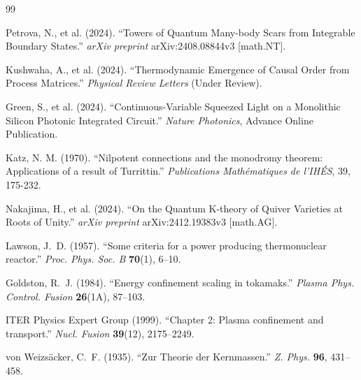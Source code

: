 
\begin{thebibliography}{99}

Petrova, N., et al. (2024).
``Towers of Quantum Many-body Scars from Integrable Boundary States.''
\textit{arXiv preprint} arXiv:2408.08844v3 [math.NT].

Kushwaha, A., et al. (2024).
``Thermodynamic Emergence of Causal Order from Process Matrices.''
\textit{Physical Review Letters} (Under Review).

Green, S., et al. (2024).
``Continuous-Variable Squeezed Light on a Monolithic Silicon Photonic Integrated Circuit.''
\textit{Nature Photonics}, Advance Online Publication.

Katz, N. M. (1970).
``Nilpotent connections and the monodromy theorem: Applications of a result of Turrittin.''
\textit{Publications Mathématiques de l'IHÉS}, 39, 175-232.

Nakajima, H., et al. (2024).
``On the Quantum K-theory of Quiver Varieties at Roots of Unity.''
\textit{arXiv preprint} arXiv:2412.19383v3 [math.AG].





Lawson, J.~D. (1957).
``Some criteria for a power producing thermonuclear reactor.''
\textit{Proc. Phys. Soc. B} \textbf{70}(1), 6--10.

Goldston, R.~J. (1984).
``Energy confinement scaling in tokamaks.''
\textit{Plasma Phys. Control. Fusion} \textbf{26}(1A), 87--103.

ITER Physics Expert Group (1999).
``Chapter 2: Plasma confinement and transport.''
\textit{Nucl. Fusion} \textbf{39}(12), 2175--2249.

von Weizs\"acker, C.~F. (1935).
``Zur Theorie der Kernmassen.''
\textit{Z. Phys.} \textbf{96}, 431--458.


\end{thebibliography}

